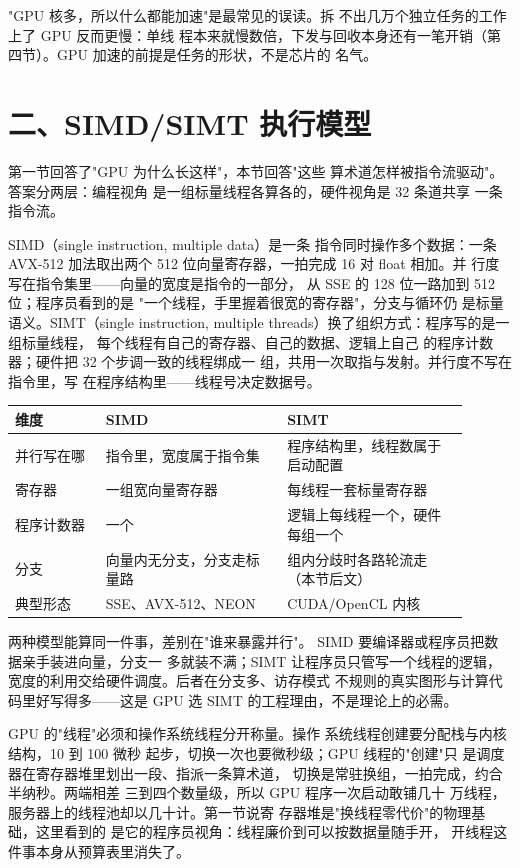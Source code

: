 \begin{warningbox}
"GPU 核多，所以什么都能加速"是最常见的误读。拆
不出几万个独立任务的工作上了 GPU 反而更慢：单线
程本来就慢数倍，下发与回收本身还有一笔开销（第
四节）。GPU 加速的前提是任务的形状，不是芯片的
名气。
\end{warningbox}

\section{二、SIMD/SIMT 执行模型}

第一节回答了"GPU 为什么长这样"，本节回答"这些
算术道怎样被指令流驱动"。答案分两层：编程视角
是一组标量线程各算各的，硬件视角是 32 条道共享
一条指令流。

SIMD（single instruction, multiple data）是一条
指令同时操作多个数据：一条 AVX-512 加法取出两个
512 位向量寄存器，一拍完成 16 对 float 相加。并
行度写在指令集里——向量的宽度是指令的一部分，
从 SSE 的 128 位一路加到 512 位；程序员看到的是
"一个线程，手里握着很宽的寄存器"，分支与循环仍
是标量语义。SIMT（single instruction, multiple
threads）换了组织方式：程序写的是一组标量线程，
每个线程有自己的寄存器、自己的数据、逻辑上自己
的程序计数器；硬件把 32 个步调一致的线程绑成一
组，共用一次取指与发射。并行度不写在指令里，写
在程序结构里——线程号决定数据号。

\begin{longtable}{L{0.18\linewidth}L{0.36\linewidth}L{0.36\linewidth}}
\toprule
维度 & SIMD & SIMT \\
\midrule
并行写在哪 & 指令里，宽度属于指令集 & 程序结构里，线程数属于启动配置 \\
寄存器 & 一组宽向量寄存器 & 每线程一套标量寄存器 \\
程序计数器 & 一个 & 逻辑上每线程一个，硬件每组一个 \\
分支 & 向量内无分支，分支走标量路 & 组内分歧时各路轮流走（本节后文） \\
典型形态 & SSE、AVX-512、NEON & CUDA/OpenCL 内核 \\
\bottomrule
\end{longtable}

两种模型能算同一件事，差别在"谁来暴露并行"。
SIMD 要编译器或程序员把数据亲手装进向量，分支一
多就装不满；SIMT 让程序员只管写一个线程的逻辑，
宽度的利用交给硬件调度。后者在分支多、访存模式
不规则的真实图形与计算代码里好写得多——这是
GPU 选 SIMT 的工程理由，不是理论上的必需。

GPU 的"线程"必须和操作系统线程分开称量。操作
系统线程创建要分配栈与内核结构，10 到 100 微秒
起步，切换一次也要微秒级；GPU 线程的"创建"只
是调度器在寄存器堆里划出一段、指派一条算术道，
切换是常驻换组，一拍完成，约合半纳秒。两端相差
三到四个数量级，所以 GPU 程序一次启动敢铺几十
万线程，服务器上的线程池却以几十计。第一节说寄
存器堆是"换线程零代价"的物理基础，这里看到的
是它的程序员视角：线程廉价到可以按数据量随手开，
开线程这件事本身从预算表里消失了。

